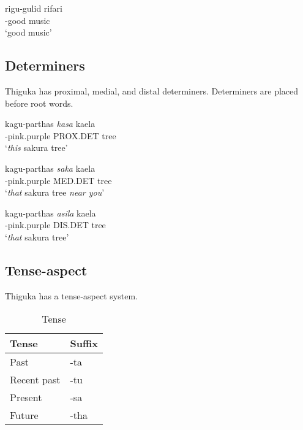 \begin{exe}
    \ex{} \gll{}ri\textapprox{}gu-gulid rifari\\
    \agradj{}-good music\\
    \glt{}`good music'
\end{exe}

\subsection{Determiners}
Thiguka has proximal, medial, and distal determiners. Determiners are placed before root words. 

\begin{exe}
    \ex{} \gll{}ka\textapprox{}gu-parthas \emph{kasa} kaela\\
    \agradj{}-pink.purple PROX.DET tree\\
    \glt{}`\emph{this} sakura tree'
\end{exe}

\begin{exe}
    \ex{} \gll{}ka\textapprox{}gu-parthas \emph{saka} kaela\\
    \agradj{}-pink.purple MED.DET tree\\
    \glt{}`\emph{that} sakura tree \emph{near you}'
\end{exe}

\begin{exe}
    \ex{} \gll{}ka\textapprox{}gu-parthas \emph{asila} kaela\\
    \agradj{}-pink.purple DIS.DET tree\\
    \glt{}`\emph{that} sakura tree'
\end{exe}

\subsection{Tense-aspect}
Thiguka has a tense-aspect system.

\begin{table}[h!]
    \centering
    \begin{tabularx}{8cm}{|X|X|}
        \hline
        \textbf{Tense} & \textbf{Suffix} \\
        \hline
        Past & -ta \\
        Recent past & -tu \\
        Present & -sa \\
        Future & -tha \\
        \hline
    \end{tabularx}
    \caption{Tense}
\end{table}

